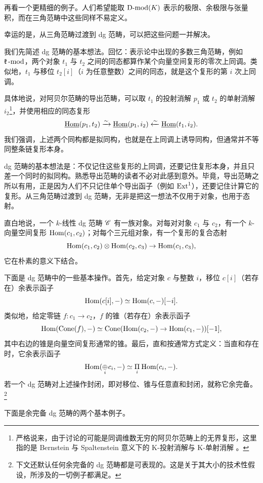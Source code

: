 再看一个更精细的例子。人们希望能取 $\operatorname{D-mod}(K)$ 表示的极限、余极限与张量积，而在三角范畴中这些同样不易定义。

幸运的是，从三角范畴过渡到 dg 范畴，可以把这些问题一并解决。

\ssszh 我们先简述 dg 范畴的基本想法。回忆：表示论中出现的多数三角范畴，例如 $\mathfrak{k}\operatorname{-mod}$，两个对象 $t_1$ 与 $t_2$ 之间的同态都算作某个向量空间复形的零次上同调。类似地，$t_1$ 与移位 $t_2[i]$（$i$ 为任意整数）之间的同态，就是这个复形的第 $i$ 次上同调。

具体地说，对阿贝尔范畴的导出范畴，可以取 $t_1$ 的投射消解 $p_1$ 或 $t_2$ 的单射消解 $i_2$\footnote{严格说来，由于讨论的可能是同调维数无穷的阿贝尔范畴上的无界复形，这里指的是 Bernstein 与 Spaltenstein 意义下的 K-投射消解与 K-单射消解 \cite{spaltenstein}。}，并使用相应的同态复形
%
\[
  \underline{\operatorname{Hom}}(p_1, t_2) \xrightarrow{\sim} \underline{\operatorname{Hom}}(p_1, i_2) \xleftarrow{\sim}
  \underline{\operatorname{Hom}}(t_1, i_2).
\]
%
我们强调，上述两个同构都是拟同构，也就是在上同调上诱导同构，但通常并不等同整条链复形本身。

dg 范畴的基本想法是：不仅记住这些复形的上同调，还要记住复形本身，并且只差一个同时的拟同构。熟悉导出范畴的读者不必对此感到意外。毕竟，导出范畴之所以有用，正是因为人们不只记住单个导出函子（例如 $\operatorname{Ext}^1$），还要记住计算它的复形。从三角范畴过渡到 dg 范畴，无非是把这一想法不仅用于对象，也用于态射。

\ssszh 直白地说，一个 $k$-线性 dg 范畴 $\mathscr{C}$ 有一族对象。对每对对象 $c_1$ 与 $c_2$，有一个 $k$-向量空间复形 $\operatorname{Hom}(c_1, c_2)$；对每个三元组对象，有一个复形的复合态射
%
\[
\operatorname{Hom}(c_1, c_2) \otimes \operatorname{Hom}(c_2, c_3) \rightarrow \operatorname{Hom}(c_1, c_3),
  \]
%
它在朴素的意义下结合。

下面是 dg 范畴中的一些基本操作。首先，给定对象 $c$ 与整数 $i$，移位 $c[i]$（若存在）余表示函子
%
\[
\operatorname{Hom}(c[i], -) \simeq \operatorname{Hom}(c,-)[-i].
\]
%
类似地，给定零链 $f: c_1 \rightarrow c_2$，$f$ 的锥（若存在）余表示函子
%
\[
   \operatorname{Hom}( \operatorname{Cone}(f), -) \simeq \operatorname{Cone}( \operatorname{Hom}(c_2, -) \rightarrow
   \operatorname{Hom}(c_1, -))[-1],
\]
%
其中右边的锥是向量空间复形通常的锥。最后，直和按通常方式定义：当直和存在时，它余表示函子
%
\[
   \operatorname{Hom}( \underset{i}{\oplus} \hspace{.2mm} c_i, -) \simeq \underset{i}\Pi
   \hspace{.2mm} \operatorname{Hom}( c_i, -).
\]
%
若一个 dg 范畴对上述操作封闭，即对移位、锥与任意直和封闭，就称它余完备。\footnote{下文还默认任何余完备的 dg 范畴都是可表现的。这是关于其大小的技术性假设，所涉及的一切例子都满足。}

\ssszh 下面是余完备 dg 范畴的两个基本例子。

